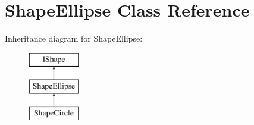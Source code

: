 \hypertarget{class_shape_ellipse}{}\section{Shape\+Ellipse Class Reference}
\label{class_shape_ellipse}
Inheritance diagram for Shape\+Ellipse\+:\begin{figure}[H]
\begin{center}
\leavevmode
\includegraphics[height=3.000000cm]{class_shape_ellipse}
\end{center}
\end{figure}
